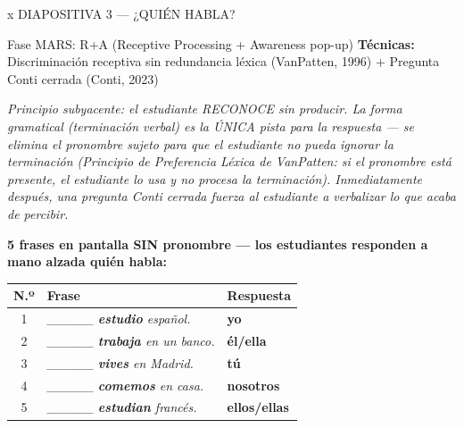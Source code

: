 \documentclass[a4paper,10pt]{article}
\renewcommand{\arraystretch}{1.3}
\begin{document}
\begin{diapheader}{x}
DIAPOSITIVA 3 — ¿QUIÉN HABLA?
\end{diapheader}

\vspace{0.3cm}

\begin{marsbox}{Fase MARS: R+A (Receptive Processing + Awareness pop-up)}
\textbf{Técnicas:} Discriminación receptiva sin redundancia léxica (VanPatten, 1996) + Pregunta Conti cerrada (Conti, 2023)
\end{marsbox}

\vspace{0.2cm}

{\small\textit{Principio subyacente: el estudiante RECONOCE sin producir. La forma gramatical (terminación verbal) es la ÚNICA pista para la respuesta — se elimina el pronombre sujeto para que el estudiante no pueda ignorar la terminación (Principio de Preferencia Léxica de VanPatten: si el pronombre está presente, el estudiante lo usa y no procesa la terminación). Inmediatamente después, una pregunta Conti cerrada fuerza al estudiante a verbalizar lo que acaba de percibir.}}

\vspace{0.4cm}

\noindent\textcolor{azulprincipal}{\textbf{\large 5 frases en pantalla SIN pronombre — los estudiantes responden a mano alzada quién habla:}}

\vspace{0.3cm}

\renewcommand{\arraystretch}{1.8}
\begin{center}
\begin{tabular}{c p{7cm} >{\centering\arraybackslash}p{3.5cm}}
\textbf{N.º} & \textbf{Frase} & \textbf{Respuesta} \\
\midrule
1 & \textit{\_\_\_\_\_ \textbf{estudio} español.} & \textbf{yo} \\
2 & \textit{\_\_\_\_\_ \textbf{trabaja} en un banco.} & \textbf{él/ella} \\
3 & \textit{\_\_\_\_\_ \textbf{vives} en Madrid.} & \textbf{tú} \\
4 & \textit{\_\_\_\_\_ \textbf{comemos} en casa.} & \textbf{nosotros} \\
5 & \textit{\_\_\_\_\_ \textbf{estudian} francés.} & \textbf{ellos/ellas} \\
\end{tabular}
\end{center}
\end{document}
